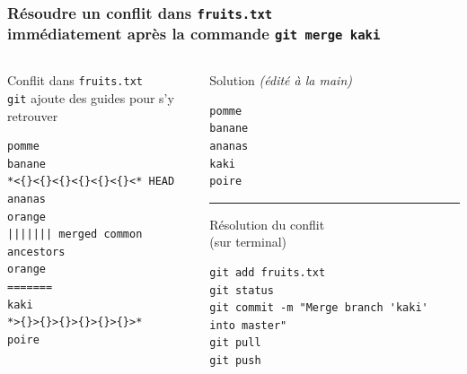 \documentclass[table,tikz,12pt,svgnames]{beamer}
\begin{document}

\begin{frame}[fragile]
\frametitle{Résoudre un conflit dans \texttt{fruits.txt}\\
\small immédiatement après la commande \texttt{git merge kaki}}
\begin{adjustwidth}{0cm}{-0.8cm}{}
	\begin{columns}[T] %
		\begin{column}{.55\textwidth}
			\color{darkgreen}%
			\noindent
			Conflit dans \texttt{fruits.txt} \\ {\footnotesize\texttt{git} ajoute des guides pour s'y retrouver}
			\color{black}
			\begin{verbatim}
pomme
banane
*<{}<{}<{}<{}<{}<{}<* HEAD
ananas
orange
||||||| merged common ancestors
orange
=======
kaki
*>{}>{}>{}>{}>{}>{}>*
poire
		\end{verbatim}
		\end{column}%
\PAUSE
		\begin{column}{.5\textwidth}
			\color{darkgreen}%
			Solution \textit{(édité à la main)}
			\color{black}
			\begin{verbatim}
pomme
banane
ananas
kaki
poire
			\end{verbatim}
\PAUSE

\color{gray}\rule{\linewidth}{3pt}
\color{darkgreen}%
Résolution du conflit \\ \small(sur terminal)
\color{black}
			\begin{verbatim}
git add fruits.txt
git status
git commit -m "Merge branch 'kaki' into master"
git pull
git push
			\end{verbatim}
		\end{column}%
	\end{columns}
\end{adjustwidth}
\end{frame}
\end{document}
